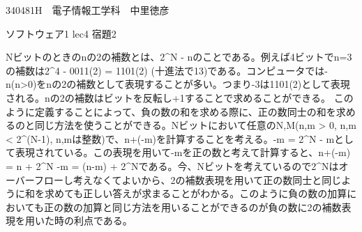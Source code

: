 \documentclass[uplatex]{jsarticle}
\begin{document}
340481H　電子情報工学科　中里徳彦

ソフトウェア1 lec4 宿題2

Nビットのときのnの2の補数とは、2^N - nのことである。例えば4ビットでn=3の補数は2^4 - 0011(2) = 1101(2) (十進法で13)である。コンピュータでは-n(n>0)をnの2の補数として表現することが多い。つまり-3は1101(2)として表現される。nの2の補数はビットを反転し+1することで求めることができる。
このように定義することによって、負の数の和を求める際に、正の数同士の和を求めるのと同じ方法を使うことができる。Nビットにおいて任意のN,M(n,m > 0, n,m < 2^(N-1), n,mは整数)で、n+(-m)を計算することを考える。-m = 2^N - mとして表現されている。この表現を用いて-mを正の数と考えて計算すると、n+(-m) = n + 2^N -m = (n-m) + 2^Nである。今、Nビットを考えているので2^Nはオーバーフローし考えなくてよいから、2の補数表現を用いて正の数同士と同じように和を求めても正しい答えが求まることがわかる。このように負の数の加算においても正の数の加算と同じ方法を用いることができるのが負の数に2の補数表現を用いた時の利点である。
\end{document}
